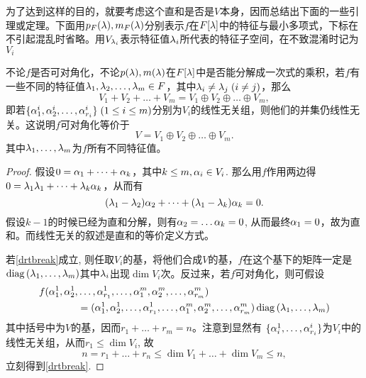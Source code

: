 为了达到这样的目的，就要考虑这个直和是否是$V$本身，因而总结出下面的一些引理或定理。下面用$p_F(\lambda),m_F(\lambda)$分别表示$f$在$F[\lambda]$中的特征与最小多项式，下标在不引起混乱时省略。用$V_{\lambda_i}$表示特征值$\lambda_i$所代表的特征子空间，在不致混淆时记为$V_i$
\begin{thm}\label{thm:vidrt}
    不论$f$是否可对角化，不论$p(\lambda),m(\lambda)$在$F[\lambda]$中是否能分解成一次式的乘积，若$f$有一些不同的特征值$\lambda_1,\lambda_2,\dots,\lambda_m\in F$，其中$\lambda_i\neq \lambda_j\;(i\neq j)$，那么
    \[V_1+V_2+\dots +V_m=V_1\oplus V_2\oplus \dots \oplus V_m,\]
    即若$\{\alpha_1^i,\alpha_2^i,\dots,\alpha_{r_i}^i\}\;(1\leq i\leq m)$分别为$V_i$的线性无关组，则他们的并集仍线性无关。这说明$f$可对角化等价于
    \begin{equation}
    V=V_1\oplus V_2\oplus\dots\oplus V_m.\label{drtbreak}
    \end{equation}
    其中$\lambda_1,\dots,\lambda_m$为$f$所有不同特征值。
\end{thm}
\begin{proof}
    假设$0=\alpha_1+\dots+\alpha_k$，其中$k\leq m, \alpha_i\in V_i$. 那么用$f$作用两边得$0=\lambda_1\lambda_1+\dots+\lambda_k\alpha_k$，从而有
    \[(\lambda_1-\lambda_2)\alpha_2+\dots+(\lambda_1-\lambda_k)\alpha_k=0.\]
    假设$k-1$的时候已经为直和分解，则有$\alpha_2=\dots\alpha_k=0$, 从而最终$\alpha_1=0$，故为直和。而线性无关的叙述是直和的等价定义方式。
    
    若\eqref{drtbreak}成立, 则任取$V_i$的基，将他们合成$V$的基，$f$在这个基下的矩阵一定是
    $\operatorname*{diag\,}(\lambda_1,\dots,\lambda_m)$其中$\lambda_i$出现$\dim V_i$次。反过来，若$f$可对角化，则可假设
    \begin{align*}
    f(\alpha_1^1,\alpha_2^1,&\dots,\alpha_{r_1}^1,\dots,\alpha_1^m,\alpha_2^m,\dots,\alpha_{r_m}^m)\\
    &=(\alpha_1^1,\alpha_2^1,\dots,\alpha_{r_1}^1,\dots,\alpha_1^m,\alpha_2^m,\dots,\alpha_{r_m}^m)\operatorname*{diag\,}(\lambda_1,\dots,\lambda_m)
    \end{align*}
    其中括号中为$V$的基，因而$r_1+\dots+r_m=n$。注意到显然有
    $\{\alpha_i^1,\dots,\alpha_{r_i}^i\}$为$V_i$中的线性无关组，从而$r_1\leq \dim V_i$, 故
    \[n=r_1+\dots+r_n\leq \dim V_1+\dots +\dim V_m\leq n,\]
    立刻得到\eqref{drtbreak}.
\end{proof}

